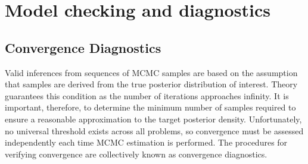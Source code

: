 \documentclass[]{jss}
\begin{document}
% 
% 
% 
% 
% 
% 
% 
% 
% 
% 
% 
% 
% 
\section[Model Checking]{Model checking and diagnostics}
\label{chap:modelchecking}

\subsection{Convergence Diagnostics} %

Valid inferences from sequences of MCMC samples are based on the assumption that samples are derived from the true posterior distribution of interest. Theory guarantees this condition as the number of iterations approaches infinity. It is important, therefore, to determine the minimum number of samples required to ensure a reasonable approximation to the target posterior density. Unfortunately, no universal threshold exists across all problems, so convergence must be assessed independently each time MCMC estimation is performed. The procedures for verifying convergence are collectively known as convergence diagnostics.
\end{document}
